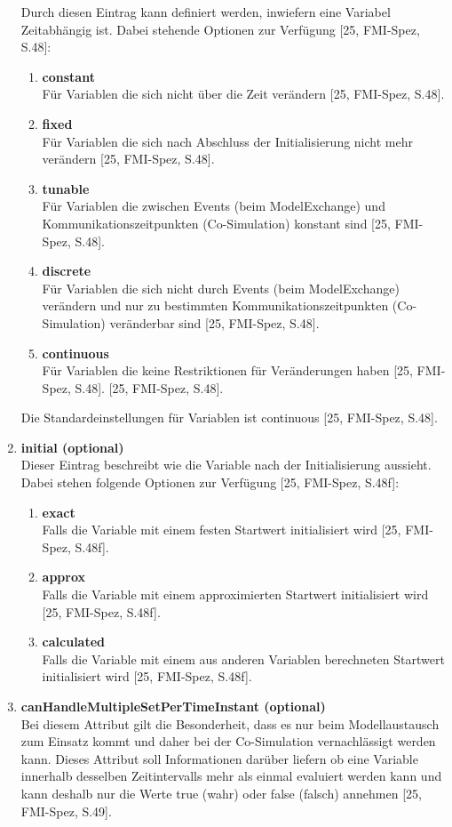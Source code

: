 \begin{enumerate}
	Durch diesen Eintrag kann definiert werden, inwiefern eine Variabel Zeitabhängig ist. Dabei
	stehende Optionen zur Verfügung [25, FMI-Spez, S.48]:
		\begin{enumerate}
		\item \textbf{constant} \\
		Für Variablen die sich nicht über die Zeit verändern [25, FMI-Spez, S.48].
		\item \textbf{fixed} \\
		Für Variablen die sich nach Abschluss der Initialisierung nicht mehr verändern
		[25, FMI-Spez, S.48].
		\item \textbf{tunable} \\
		Für Variablen die zwischen Events (beim ModelExchange) und
		Kommunikationszeitpunkten (Co-Simulation) konstant sind [25, FMI-Spez, S.48].
		\item \textbf{discrete} \\
		Für Variablen die sich nicht durch Events (beim ModelExchange)
		verändern und nur zu bestimmten Kommunikationszeitpunkten (Co-Simulation) veränderbar
		sind [25, FMI-Spez, S.48].
		\item \textbf{continuous} \\
		Für Variablen die keine Restriktionen für Veränderungen haben
		[25, FMI-Spez, S.48]. [25, FMI-Spez, S.48].
		\end{enumerate}
	Die Standardeinstellungen für Variablen ist continuous [25, FMI-Spez, S.48].
	\item \textbf{initial (optional)} \\
	Dieser Eintrag beschreibt wie die Variable nach der Initialisierung aussieht. Dabei stehen
	folgende Optionen zur Verfügung [25, FMI-Spez, S.48f]:
	\begin{enumerate}
		\item \textbf{exact} \\
		Falls die Variable mit einem festen Startwert initialisiert wird [25, FMI-Spez, S.48f].
		\item \textbf{approx} \\
		Falls die Variable mit einem approximierten Startwert initialisiert wird
		[25, FMI-Spez, S.48f].
		\item \textbf{calculated} \\
		Falls die Variable mit einem aus anderen Variablen berechneten
		Startwert initialisiert wird [25, FMI-Spez, S.48f].
		\end{enumerate}
	\item \textbf{canHandleMultipleSetPerTimeInstant (optional)} \\
	Bei diesem Attribut gilt die Besonderheit, dass es nur beim Modellaustausch zum Einsatz
	kommt und daher bei der Co-Simulation vernachlässigt werden kann. Dieses Attribut soll 
	Informationen darüber liefern ob eine Variable innerhalb desselben Zeitintervalls mehr als 
	einmal evaluiert werden kann und kann deshalb nur die Werte true (wahr) oder false (falsch) 
	annehmen [25, FMI-Spez, S.49].
\end{enumerate}
